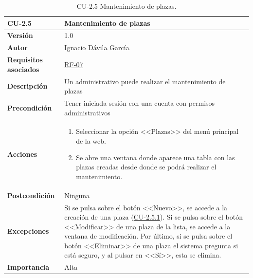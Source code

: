 \begin{table}[p]
	\centering
	\begin{tabularx}{\linewidth}{ p{} p{} }
		\toprule
		\textbf{CU-2.5}    & \textbf{Mantenimiento de plazas}\\
		\toprule
		\textbf{Versión}              & 1.0    \\
		\textbf{Autor}                & Ignacio Dávila García \\
		\textbf{Requisitos asociados} & \hyperref[itm:RF7]{RF-07} \\
		\textbf{Descripción}          & Un administrativo puede realizar el mantenimiento de plazas \\
		\textbf{Precondición}         & Tener iniciada sesión con una cuenta con permisos administrativos \\
		\textbf{Acciones}             &
		\begin{enumerate}
			\def\labelenumi{\arabic{enumi}.}
			\tightlist
			\item Seleccionar la opción <<Plazas>> del menú principal de la web.
			\item Se abre una ventana donde aparece una tabla con las plazas creadas desde donde se podrá realizar el mantenimiento.
		\end{enumerate}\\
		\textbf{Postcondición}        & Ninguna \\
		\textbf{Excepciones}          & Si se pulsa sobre el botón <<Nuevo>>, se accede a la creación de una plaza (\hyperref[table:CU-2.5.1]{CU-2.5.1}). Si se pulsa sobre el botón <<Modificar>> de una plaza de la lista, se accede a la ventana de modificación. Por último, si se pulsa sobre el botón <<Eliminar>> de una plaza el sistema pregunta si está seguro, y al pulsar en <<Sí>>, esta se elimina. \\
		\textbf{Importancia}          & Alta \\
		\bottomrule
	\end{tabularx}
	\caption{CU-2.5 Mantenimiento de plazas.}
\end{table}
\FloatBarrier

